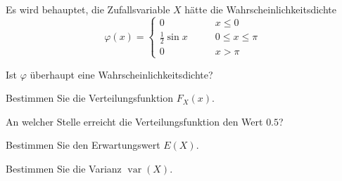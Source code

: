 Es wird behauptet, die Zufallsvariable $X$ hätte die Wahrscheinlichkeitsdichte
\[
\varphi(x)=\begin{cases}
0&\qquad x\le 0\\
\frac12\sin x&\qquad 0\le x\le \pi\\
0&\qquad x > \pi
\end{cases}
\]
\begin{teilaufgaben}
\item Ist $\varphi$ überhaupt eine Wahrscheinlichkeitsdichte?
\item Bestimmen Sie die Verteilungsfunktion $F_X(x)$.
\item An welcher Stelle erreicht die Verteilungsfunktion den Wert $0.5$?
\item Bestimmen Sie den Erwartungswert $E(X)$.
\item Bestimmen Sie die Varianz $\operatorname{var}(X)$.
\end{teilaufgaben}


